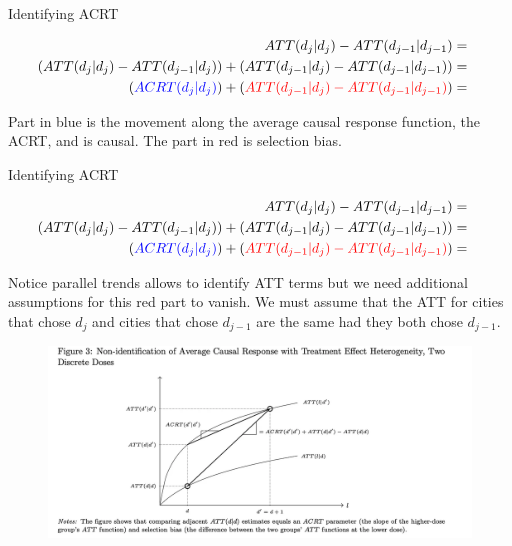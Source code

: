 \documentclass{beamer}
\begin{document}
\begin{frame}{Identifying ACRT}


\begin{eqnarray*}
ATT(d_j|d_j) - ATT(d_{j-1} | d_{j-1}) &=& \\
( ATT(d_j|d_j) - ATT(d_{j-1} | d_{j}) ) + ( ATT(d_{j-1} | d_j) - ATT(d_{j-1} | d_{j-1}) )&=&  \\
 ( \textcolor{blue}{ACRT(d_j | d_j)} ) + ( \textcolor{red}{ATT(d_{j-1} | d_j) - ATT(d_{j-1} | d_{j-1})} )&=&  \\
\end{eqnarray*}

Part in blue is the movement along the average causal response function, the ACRT, and is causal.  The part in red is selection bias. 

\end{frame}

\begin{frame}{Identifying ACRT}


\begin{eqnarray*}
ATT(d_j|d_j) - ATT(d_{j-1} | d_{j-1}) &=& \\
( ATT(d_j|d_j) - ATT(d_{j-1} | d_{j}) ) + ( ATT(d_{j-1} | d_j) - ATT(d_{j-1} | d_{j-1}) )&=&  \\
 ( \textcolor{blue}{ACRT(d_j | d_j)} ) + ( \textcolor{red}{ATT(d_{j-1} | d_j) - ATT(d_{j-1} | d_{j-1})} )&=&  \\
\end{eqnarray*}

Notice parallel trends allows to identify ATT terms but we need additional assumptions for this red part to vanish. We must assume that the ATT for cities that chose $d_j$ and cities that chose $d_{j-1}$ are the same had they both chose $d_{j-1}$.

\end{frame}

\begin{frame}


\begin{figure}
\begin{center}
             \includegraphics[scale=0.45]{./lecture_includes/continuous5.png}
\end{center}
\end{figure}

\end{frame}
\end{document}
